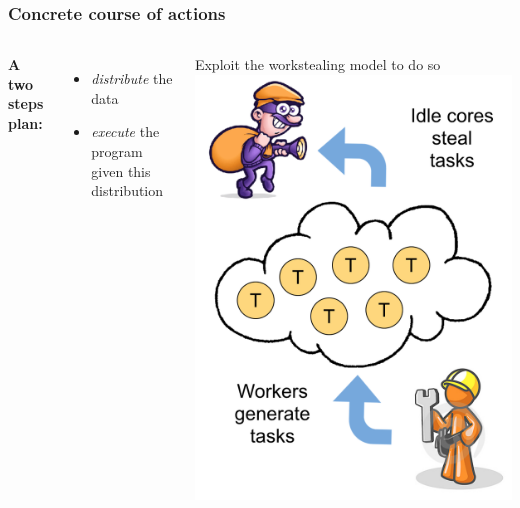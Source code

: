 \documentclass[xcolor={usenames,dvipsnames,svgnames,table}, aspectratio=43]{beamer}
\begin{document}
\begin{frame}[fragile]
\frametitle{Concrete course of actions}

\begin{columns}[T,onlytextwidth]
  \vspace{2cm}
  \textbf{A two steps plan:}
  \begin{itemize}
    \item \textit{distribute} the data
    \item \textit{execute} the program given this distribution
  \end{itemize}
 {
  \alert{Exploit the workstealing model to do so}
}
 {
  \includegraphics[scale=0.38]{graph/ws}
}
\end{columns}

\end{frame}
\end{document}
